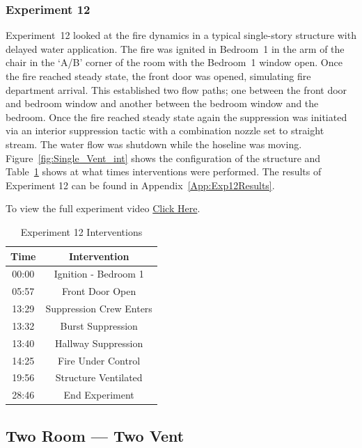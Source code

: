 \documentclass[12pt,oneside]{book}
\begin{document}
\subsubsection{Experiment 12}
Experiment~12 looked at the fire dynamics in a typical single-story structure with delayed water application. The fire was ignited in Bedroom~1 in the arm of the chair in the `A/B' corner of the room with the Bedroom~1 window open. Once the fire reached steady state, the front door was opened, simulating fire department arrival. This established two flow paths; one between the front door and bedroom window and another between the bedroom window and the bedroom. Once the fire reached steady state again the suppression was initiated via an interior suppression tactic with a combination nozzle set to straight stream. The water flow was shutdown while the hoseline was moving.  Figure~\ref{fig:Single_Vent_int} shows the configuration of the structure and Table~\ref{Table:Exp12Interventions} shows at what times interventions were performed. The results of Experiment 12 can be found in Appendix~\ref{App:Exp12Results}. 

To view the full experiment video \href{https://player.vimeo.com/video/170510940?autoplay=1}{Click Here}.

\begin{table}[H]
	\centering
	\caption{Experiment 12 Interventions}
	\begin{tabular}{|c|c|} 
		\hline
		Time & Intervention \\ \hline \hline
		00:00 & Ignition - Bedroom 1 \\ \hline
		05:57 & Front Door Open \\ \hline
		13:29 & Suppression Crew Enters\\ \hline
		13:32 & Burst Suppression \\ \hline 
		13:40 & Hallway Suppression \\ \hline
		14:25 & Fire Under Control \\ \hline
		19:56 & Structure Ventilated \\ \hline
		28:46 & End Experiment\\ \hline
	\end{tabular}
	\label{Table:Exp12Interventions}
\end{table}

\clearpage

\subsection{Two Room --- Two Vent}
\end{document}
